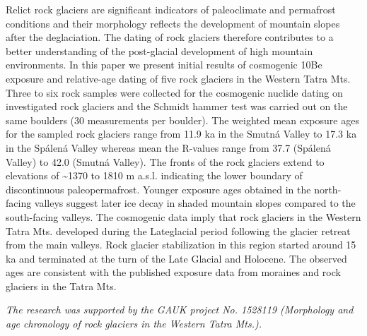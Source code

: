 {Relict rock glaciers are significant indicators of paleoclimate and permafrost conditions and their morphology reflects the development of mountain slopes after the deglaciation. The dating of rock glaciers therefore contributes to a better understanding of the post-glacial development of high mountain environments. In this paper we present initial results of cosmogenic 10Be exposure and relative-age dating of five rock glaciers in the Western Tatra Mts. Three to six rock samples were collected for the cosmogenic nuclide dating on investigated rock glaciers and the Schmidt hammer test was carried out on the same boulders (30 measurements per boulder). The weighted mean exposure ages for the sampled rock glaciers range from 11.9 ka in the Smutná Valley to 17.3 ka in the Spálená Valley whereas mean the R-values range from 37.7 (Spálená Valley) to 42.0 (Smutná Valley). The fronts of the rock glaciers extend to elevations of \textasciitilde1370 to 1810 m a.s.l. indicating the lower boundary of discontinuous paleopermafrost. Younger exposure ages obtained in the north-facing valleys suggest later ice decay in shaded mountain slopes compared to the south-facing valleys. The cosmogenic data imply that rock glaciers in the Western Tatra Mts. developed during the Lateglacial period following the glacier retreat from the main valleys.  Rock glacier stabilization in this region started around 15 ka and terminated at the turn of the Late Glacial and Holocene. The observed ages are consistent with the published exposure data from moraines and rock glaciers in the Tatra Mts.

\textit{The research was supported by the GAUK project No. 1528119 (Morphology and age chronology of rock glaciers in the Western Tatra Mts.).}
	
}
{
}


